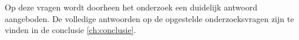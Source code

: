 
Op deze vragen wordt doorheen het onderzoek een duidelijk antwoord aangeboden. De volledige antwoorden op de opgestelde onderzoeksvragen zijn te vinden in de conclusie \ref{ch:conclusie}.


\section{}%
\label{sec:onderzoeksdoelstelling}
\begin{comment}
    Wat is het beoogde resultaat van je bachelorproef? Wat zijn de criteria voor succes? Beschrijf die zo concreet mogelijk. Gaat het bv.\ om een proof-of-concept, een prototype, een verslag met aanbevelingen, een vergelijkende studie, enz.
\end{comment}


\section{}%
\label{sec:opzet-bachelorproef}

\begin{comment}
    De rest van deze bachelorproef is als volgt opgebouwd:
    
    In Hoofdstuk~\ref{ch:stand-van-zaken} wordt een overzicht gegeven van de stand van zaken binnen het onderzoeksdomein, op basis van een literatuurstudie.
    
    In Hoofdstuk~\ref{ch:methodologie} wordt de methodologie toegelicht en worden de gebruikte onderzoekstechnieken besproken om een antwoord te kunnen formuleren op de onderzoeksvragen.
    
    
    In Hoofdstuk~\ref{ch:conclusie}, tenslotte, wordt de conclusie gegeven en een antwoord geformuleerd op de onderzoeksvragen. Daarbij wordt ook een aanzet gegeven voor toekomstig onderzoek binnen dit domein.
\end{comment}

